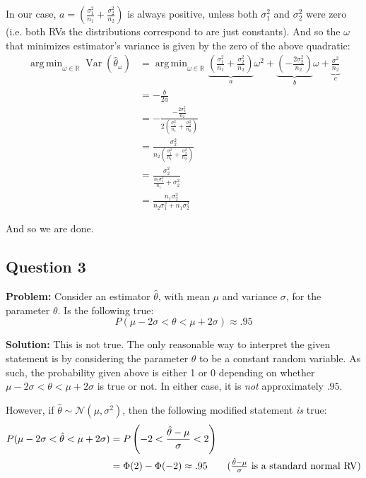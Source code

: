 \documentclass{article}
\DeclareMathOperator{\Var}{Var}
\DeclareMathOperator*{\argmin}{arg\,min}
\begin{document}
In our case, $a=\left(\frac{\sigma^2_1}{n_1}+\frac{\sigma^2_2}{n_2}\right)$ is always positive, unless both $\sigma^2_1$ and $\sigma^2_2$ were zero (i.e. both RVs the distributions correspond to are just constants). And so the $\omega$ that minimizes estimator's variance is given by the zero of the above quadratic:
\begin{align*}
    \argmin_{\omega\in\mathbb R}\Var(\hat\theta_\omega)&=\argmin_{\omega\in\mathbb R}\underbrace{\left(\frac{\sigma^2_1}{n_1}+\frac{\sigma^2_2}{n_2}\right)}_{a}\omega^2+\underbrace{\left(-\frac{2\sigma^2_2}{n_2}\right)}_{b}\omega+\underbrace{\frac{\sigma^2}{n_2}}_{c}\\
    &=-\frac{b}{2a}\tag{zero of a quadratic}\\
    &=-\frac{-\frac{2\sigma^2_2}{n_2}}{2\left(\frac{\sigma^2_1}{n_1}+\frac{\sigma^2_2}{n_2}\right)}\\
    &=\frac{\sigma^2_2}{n_2\left(\frac{\sigma^2_1}{n_1}+\frac{\sigma^2_2}{n_2}\right)}\\
    &=\frac{\sigma^2_2}{\frac{n_2\sigma^2_1}{n_1}+\sigma^2_2}\\
    &=\frac{n_1\sigma^2_2}{n_2\sigma^2_1+n_1\sigma^2_2}
\end{align*}

And so we are done.

\subsection*{Question 3}
\noindent\textbf{Problem:} Consider an estimator $\hat\theta$, with mean $\mu$ and variance $\sigma$, for the parameter $\theta$. Is the following true:
$$P(\mu-2\sigma<\theta<\mu+2\sigma)\approx.95$$

\noindent\textbf{Solution:} This is not true. The only reasonable way to interpret the given statement is by considering the parameter $\theta$ to be a constant random variable. As such, the probability given above is either 1 or 0 depending on whether $\mu-2\sigma<\theta<\mu+2\sigma$ is true or not. In either case, it is \textit{not} approximately $.95$.
\bigskip

However, if $\hat\theta\sim\mathcal N(\mu,\sigma^2)$, then the following modified statement \textit{is} true:
\begin{align*}
    P(\mu-2\sigma<\hat\theta<\mu+2\sigma)&=P\left(-2<\frac{\hat\theta-\mu}{\sigma}<2\right)\\
    &=\Phi(2)-\Phi(-2)\approx.95\tag{$\frac{\hat\theta-\mu}{\sigma}$ is a standard normal RV}
\end{align*}
\end{document}
